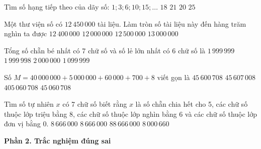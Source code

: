 \begin{ex} %
Tìm số hạng tiếp theo của dãy số: $1; 3; 6; 10; 15; \dots$
\choice
{$18$}
{\True $21$}
{$20$}
{$25$}
\end{ex}

\begin{ex} %
Một thư viện số có $12\,450\,000$ tài liệu. Làm tròn số tài liệu này đến hàng trăm nghìn ta được
\choice
{$12\,400\,000$}
{$12\,000\,000$}
{\True $12\,500\,000$}
{$13\,000\,000$}
\end{ex}

\begin{ex} %
Tổng số chẵn bé nhất có 7 chữ số và số lẻ lớn nhất có 6 chữ số là
\choice
{\True $1\,999\,999$}
{$1\,999\,998$}
{$2\,000\,000$}
{$1\,099\,999$}
\end{ex}

\begin{ex} %
Số $M = 40\,000\,000 + 5\,000\,000 + 60\,000 + 700 + 8$ viết gọn là
\choice
{$45\,600\,708$}
{$45\,607\,008$}
{$405\,060\,708$}
{\True $45\,060\,708$}
\end{ex}

\begin{ex} %
Tìm số tự nhiên $x$ có 7 chữ số biết rằng $x$ là số chẵn chia hết cho 5, các chữ số thuộc lớp triệu bằng 8, các chữ số thuộc lớp nghìn bằng 6 và các chữ số thuộc lớp đơn vị bằng 0.
\choice
{$8\,666\,000$}
{\True $8\,666\,000$}
{$88\,666\,000$}
{$8\,000\,660$}
\end{ex}

\textbf{Phần 2. Trắc nghiệm đúng sai}

